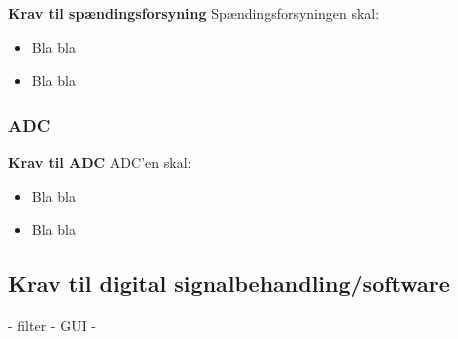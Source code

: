 \textbf{Krav til spændingsforsyning} \newline
Spændingsforsyningen skal:
\begin{itemize}
\item Bla bla
\item Bla bla
\end{itemize}



\subsubsection{ADC}


\textbf{Krav til ADC} \newline
ADC'en skal:
\begin{itemize}
\item Bla bla
\item Bla bla
\end{itemize}








\subsection{Krav til digital signalbehandling/software}
- filter
- GUI
 -
 


